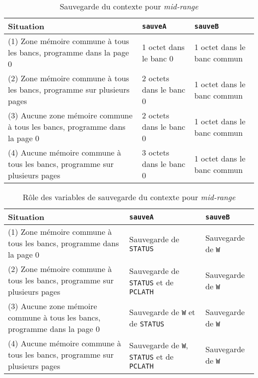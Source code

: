 \begin{table}[!ht]
  \centering
  \begin{tabular}{p{5cm}p{4cm}p{4cm}}
    \textbf{Situation} & \texttt{\bf sauveA} & \texttt{\bf sauveB}\\
    \hline
    (1) Zone mémoire commune à tous les bancs, programme dans la page 0 & 1 octet dans le banc 0 & 1 octet dans le banc commun\\
    (2) Zone mémoire commune à tous les bancs, programme sur plusieurs pages & 2 octets dans le banc 0 & 1 octet dans le banc commun\\
    (3) Aucune zone mémoire commune à tous les bancs, programme dans la page 0 & 2 octets dans le banc 0 & 1 octet dans le banc commun\\
    (4) Aucune mémoire commune à tous les bancs, programme sur plusieurs pages & 3 octets dans le banc 0 & 1 octet dans le banc commun\\
  \hline
  \end{tabular}
  \caption{Sauvegarde du contexte pour \emph{mid-range}}
\end{table}

\begin{table}[!ht]
  \centering
  \begin{tabular}{p{5cm}p{5cm}l}
    \textbf{Situation} & \texttt{\bf sauveA} & \texttt{\bf sauveB}\\
    \hline
    (1) Zone mémoire commune à tous les bancs, programme dans la page 0 & Sauvegarde de \texttt{STATUS} & Sauvegarde de \texttt{W}\\
    (2) Zone mémoire commune à tous les bancs, programme sur plusieurs pages & Sauvegarde de \texttt{STATUS} et de \texttt{PCLATH} & Sauvegarde de \texttt{W}\\
    (3) Aucune zone mémoire commune à tous les bancs, programme dans la page 0 & Sauvegarde de \texttt{W} et de \texttt{STATUS} & Sauvegarde de \texttt{W}\\
    (4) Aucune mémoire commune à tous les bancs, programme sur plusieurs pages & Sauvegarde de \texttt{W}, \texttt{STATUS} et de \texttt{PCLATH} & Sauvegarde de \texttt{W}\\
  \hline
  \end{tabular}
  \caption{Rôle des variables de sauvegarde du contexte pour \emph{mid-range}}
\end{table}


